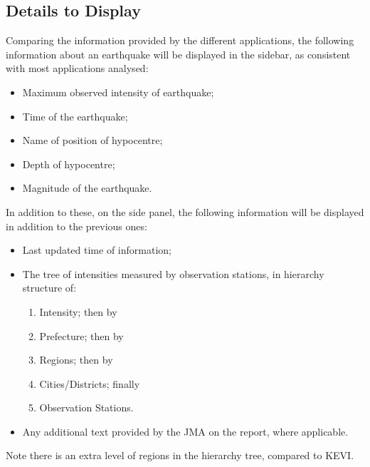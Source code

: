 \subsection{Details to Display}
Comparing the information provided by the different applications, the following information about an earthquake will be displayed in the sidebar, as consistent with most applications analysed:
\begin{itemize}
    \item Maximum observed intensity of earthquake;
    \item Time of the earthquake;
    \item Name of position of hypocentre;
    \item Depth of hypocentre;
    \item Magnitude of the earthquake.
\end{itemize}

In addition to these, on the side panel, the following information will be displayed in addition to the previous ones:
\begin{itemize}
    \item Last updated time of information;
    \item The tree of intensities measured by observation stations, in hierarchy structure of:
          \begin{enumerate}
              \item Intensity; then by
              \item Prefecture; then by
              \item Regions; then by
              \item Cities/Districts; finally
              \item Observation Stations.
          \end{enumerate}
    \item Any additional text provided by the JMA on the report, where applicable.
\end{itemize}

Note there is an extra level of regions in the hierarchy tree, compared to KEVI.


